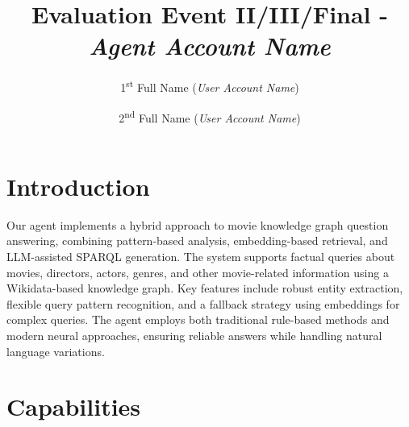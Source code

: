\documentclass{article}
\begin{document}
\title{Evaluation Event II/III/Final - \textit{Agent Account Name}}

\author{1\textsuperscript{st} Full Name (\textit{User Account Name})
\and
2\textsuperscript{nd} Full Name (\textit{User Account Name}) \\}

\maketitle


\section{Introduction}
Our agent implements a hybrid approach to movie knowledge graph question answering, combining pattern-based analysis, embedding-based retrieval, and LLM-assisted SPARQL generation. The system supports factual queries about movies, directors, actors, genres, and other movie-related information using a Wikidata-based knowledge graph. Key features include robust entity extraction, flexible query pattern recognition, and a fallback strategy using embeddings for complex queries. The agent employs both traditional rule-based methods and modern neural approaches, ensuring reliable answers while handling natural language variations.

\section{Capabilities}
\end{document}
